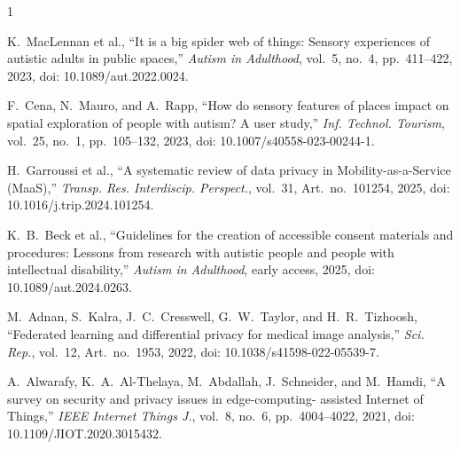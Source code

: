 \documentclass[lettersize,journal]{IEEEtran}
\begin{document}

\begin{thebibliography}{1}

K.~MacLennan et al., ``It is a big spider web of things: Sensory
experiences of autistic adults in public spaces,'' \textit{Autism in
Adulthood}, vol.~5, no.~4, pp.~411--422, 2023, doi:
10.1089/aut.2022.0024.

F.~Cena, N.~Mauro, and A.~Rapp, ``How do sensory features of places
impact on spatial exploration of people with autism? A user study,''
\textit{Inf. Technol. Tourism}, vol.~25, no.~1,
pp.~105--132, 2023, doi: 10.1007/s40558-023-00244-1.

H.~Garroussi et al., ``A systematic review of data privacy in
Mobility-as-a-Service (MaaS),'' \textit{Transp. Res. Interdiscip.
Perspect.}, vol.~31, Art.~no.~101254, 2025, doi:
10.1016/j.trip.2024.101254.

K.~B.~Beck et al., ``Guidelines for the creation of accessible consent
materials and procedures: Lessons from research with autistic people and
people with intellectual disability,'' \textit{Autism in Adulthood},
early access, 2025, doi: 10.1089/aut.2024.0263.

M.~Adnan, S.~Kalra, J.~C.~Cresswell, G.~W.~Taylor, and H.~R.~Tizhoosh,
``Federated learning and differential privacy for medical image
analysis,'' \textit{Sci. Rep.}, vol.~12, Art.~no.~1953, 2022,
doi: 10.1038/s41598-022-05539-7.

A.~Alwarafy, K.~A.~Al-Thelaya, M.~Abdallah, J.~Schneider, and
M.~Hamdi, ``A survey on security and privacy issues in edge-computing-
assisted Internet of Things,'' \textit{IEEE Internet Things J.},
vol.~8, no.~6, pp.~4004--4022, 2021, doi: 10.1109/JIOT.2020.3015432.

\end{thebibliography}
\end{document}
